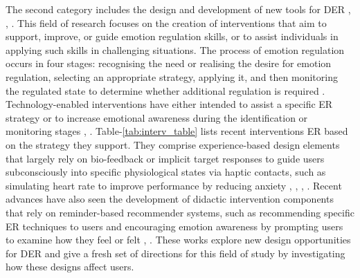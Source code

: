 \documentclass[acmtog]{acmart}
\begin{document}
The second category includes the design and development of new tools for DER \cite{kiskola2021applying}, \cite{kou2020emotion}, \cite{smith2022digital}. This field of research focuses on the creation of interventions that aim to support, improve, or guide emotion regulation skills, or to assist individuals in applying such skills in challenging situations. The process of emotion regulation occurs in four stages: recognising the need or realising the desire for emotion regulation, selecting an appropriate strategy, applying it, and then monitoring the regulated state to determine whether additional regulation is required \cite{wadley2020digital}. Technology-enabled interventions have either intended to assist a specific ER strategy or to increase emotional awareness during the identification or monitoring stages \cite{smith2022digital}, \cite{slovak2022designing}. Table-\ref{tab:interv_table} lists recent interventions ER based on the strategy they support. They comprise experience-based design elements that largely rely on bio-feedback or implicit target responses to guide users subconsciously into specific physiological states via haptic contacts, such as simulating heart rate to improve performance by reducing anxiety \cite{miri2020evaluating}, \cite{newbold2017using}, \cite{mancini2020room}, \cite{paredes2018just}. Recent advances have also seen the development of didactic intervention components that rely on reminder-based recommender systems, such as recommending specific ER techniques to users and encouraging emotion awareness by prompting users to examine how they feel or felt \cite{chen2016promoting}, \cite{costa2019boostmeup}. These works explore new design opportunities for DER and give a fresh set of directions for this field of study by investigating how these designs affect users.
\end{document}
